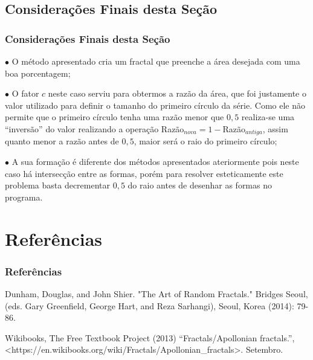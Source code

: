 \documentclass[aspectratio=169,11pt,red]{beamer}
\begin{document}
\subsection{Considerações Finais desta Seção}
\begin{frame}
\frametitle{Considerações Finais desta Seção}
$\bullet$ O método apresentado cria um fractal que preenche a área desejada com uma boa porcentagem;
\medskip

$\bullet$ O fator $c$ neste caso serviu para obtermos a razão da área, que foi justamente o valor utilizado para definir o tamanho do primeiro círculo da série. Como ele não permite que o primeiro círculo tenha uma razão menor que $0,5$ realiza-se uma ``inversão'' do valor realizando a operação Razão$_{nova} = 1-$Razão$_{antiga}$, assim quanto menor a razão antes de $0,5$, maior será o raio do primeiro círculo;
\medskip

$\bullet$ A sua formação é diferente dos métodos apresentados ateriormente pois neste caso há intersecção entre as formas, porém para resolver esteticamente este problema basta decrementar $0,5$ do raio antes de desenhar as formas no programa.
\end{frame}

\section{Referências}

\begin{frame}
\frametitle{Referências}

Dunham, Douglas, and John Shier. "The Art of Random Fractals." Bridges Seoul,(eds. Gary Greenfield, George Hart, and Reza Sarhangi), Seoul, Korea (2014): 79-86.
\bigskip

Wikibooks, The Free Textbook Project (2013) ``Fractals/Apollonian fractals.'', <https://en.wikibooks.org/wiki/Fractals/Apollonian\_fractals>. Setembro.

\end{frame}
\end{document}
